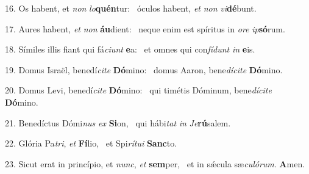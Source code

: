16. Os habent, et \textit{non} \textit{lo}\textbf{quén}tur: \ast\  óculos habent, \textit{et} \textit{non} \textit{vi}\textbf{dé}bunt.\

17. Aures habent, \textit{et} \textit{non} \textbf{áu}dient: \ast\  neque enim est spíritus in \textit{o}\textit{re} \textit{ip}\textbf{só}rum.\

18. Símiles illis fiant qui fá\textit{ci}\textit{unt} \textbf{e}a: \ast\  et omnes qui con\textit{fí}\textit{dunt} \textit{in} \textbf{e}is.\

19. Domus Israël, benedí\textit{ci}\textit{te} \textbf{Dó}mino: \ast\  domus Aaron, bene\textit{dí}\textit{ci}\textit{te} \textbf{Dó}mino.\

20. Domus Levi, benedí\textit{ci}\textit{te} \textbf{Dó}mino: \ast\  qui timétis Dóminum, bene\textit{dí}\textit{ci}\textit{te} \textbf{Dó}mino.\

21. Benedíctus Dómi\textit{nus} \textit{ex} \textbf{Si}on, \ast\  qui hábi\textit{tat} \textit{in} \textit{Je}\textbf{rú}salem.\

22. Glória Pa\textit{tri}, \textit{et} \textbf{Fí}lio, \ast\  et Spi\textit{rí}\textit{tu}\textit{i} \textbf{Sanc}to.\

23. Sicut erat in princípio, et \textit{nunc}, \textit{et} \textbf{sem}per, \ast\  et in sǽcula sæ\textit{cu}\textit{ló}\textit{rum}. \textbf{A}men.\

